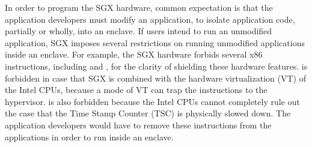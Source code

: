 
In order to program the SGX hardware, common expectation is that the application developers must modify an application, to isolate application code, partially or wholly, into an enclave.
If users intend to run an unmodified application, SGX imposes several restrictions on running unmodified applications inside an enclave.
For example, the SGX hardware forbids several x86 instructions,
including  and , for the clarity of shielding these hardware features.
 is forbidden in case that SGX is combined with the hardware virtualization (VT) of the Intel CPUs, because a mode of VT can trap the  instructions to the hypervisor.
 is also forbidden because the Intel CPUs cannot completely rule out the case that the Time Stamp Counter (TSC) is physically slowed down. 
The application developers would have to remove these instructions from the applications in order to run inside an enclave.



